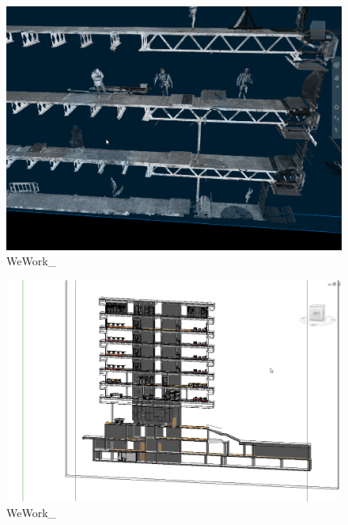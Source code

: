 \documentclass[
]{article}
\begin{document}
\begin{figure}[H]

{\centering \includegraphics{assets/WeWork/WeWork-PointCloud-Coordination4.png}

}

\caption{WeWork\_}

\end{figure}%
\begin{figure}[H]

{\centering \includegraphics{assets/WeWork/WeWork-Point-Cloud-Coordination-36-Dame.png}

}

\caption{WeWork\_}

\end{figure}%
\end{document}
